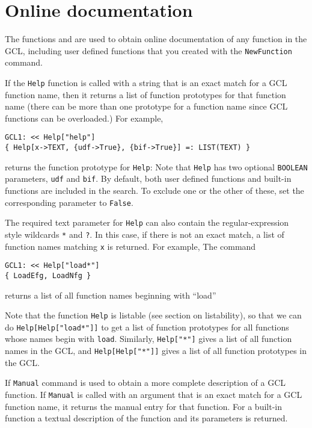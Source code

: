 \section{Online documentation}

The functions  and  are used to obtain online
documentation of any function in the GCL, including user defined
functions that you created with the \verb+NewFunction+ command. 

If the \verb+Help+ function is called with a string that is an exact
match for a GCL function name, then it returns a list of function
prototypes for that function name (there can be more than one
prototype for a function name since GCL functions can be overloaded.)
For example,

\begin{verbatim}
GCL1: << Help["help"]
{ Help[x->TEXT, {udf->True}, {bif->True}] =: LIST(TEXT) }
\end{verbatim}

\noindent
returns the function prototype for \verb+Help+: Note that \verb+Help+
has two optional \verb+BOOLEAN+ parameters, \verb+udf+ and \verb+bif+.
By default, both user defined functions and built-in functions are
included in the search.  To exclude one or the other of these, set the
corresponding parameter to \verb+False+.

The required text parameter for \verb+Help+ can also contain the
regular-expression style wildcards \verb+*+ and \verb+?+.  In this
case, if there is not an exact match, a list of function names
matching \verb+x+ is returned.  For example, The command 

\begin{verbatim}
GCL1: << Help["load*"]
{ LoadEfg, LoadNfg }
\end{verbatim}

\noindent
returns a list of all function names beginning with ``load''

Note that the function \verb+Help+ is listable (see section on
listability), so that we can do \verb+Help[Help["load*"]]+ to get a
list of function prototypes for all functions whose names begin with
\verb+load+.  Similarly, \verb+Help["*"]+ gives a list of all function
names in the GCL, and \verb+Help[Help["*"]]+ gives a list of all
function prototypes in the GCL.

If \verb+Manual+ command is used to obtain a more complete description
of a GCL function.  If \verb+Manual+ is called with an argument that
is an exact match for a GCL function name, it returns the manual entry
for that function.  For a built-in function a textual description of
the function and its parameters is returned. 

